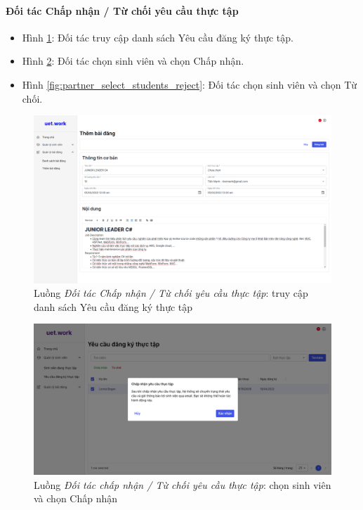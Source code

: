\documentclass[./../main.tex]{subfiles}
\begin{document}
\paragraph*{Đối tác Chấp nhận / Từ chối yêu cầu thực tập}

\begin{itemize}
	\item Hình \ref{fig:partner_list_requests_page}: Đối tác truy cập danh sách Yêu cầu đăng ký thực tập. 
	\item Hình \ref{fig:partner_select_students_approve}: Đối tác chọn sinh viên và chọn Chấp nhận.
	\item Hình \ref{fig:partner_select_students_reject}: Đối tác chọn sinh viên và chọn Từ chối.
\end{itemize}

\begin{figure}[]
	\includegraphics[width=\linewidth]{./images/image18.png} %
	\caption{Luồng \emph{Đối tác Chấp nhận / Từ chối yêu cầu thực tập}: truy cập danh sách Yêu cầu đăng ký thực tập}
	\label{fig:partner_list_requests_page}
\end{figure}

\begin{figure}[]
	\includegraphics[width=\linewidth]{./images/image66.png}
	\caption{Luồng \emph{Đối tác chấp nhận / Từ chối yêu cầu thực tập}: chọn sinh viên và chọn Chấp nhận}
	\label{fig:partner_select_students_approve}
\end{figure}
\end{document}
